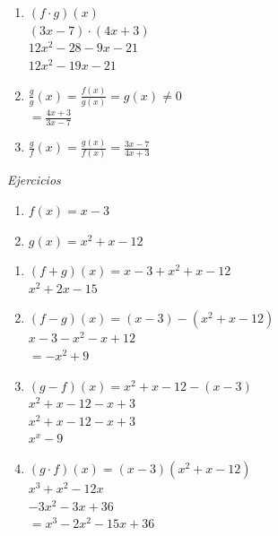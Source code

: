 \documentclass[english,10pt,a4paper]{article}
\begin{document}
{\begin{enumerate}
{	}				
	\item {\center $(f\cdot g)(x)$\\
				$(3x-7)\cdot (4x+3)$\\
				$12x^{2}-28-9x-21$\\
				$12x^{2}-19x-21$\\
	}
	
	
	\item   {\center $\frac{g}{g}(x)=\frac{f(x)}{g(x)}=g(x)\neq 0$\\
		$=\frac{4x+3}{3x-7}$\\
		

	}
	\item {\center $\frac{g}{f}(x)=\frac{g(x)}{f(x)}=\frac{3x-7}{4x+3}$\\
	}

\end{enumerate}
\newpage
{\centering\emph{Ejercicios}\\
}


\begin{enumerate}
	\item {\center $f(x)=x-3$\\
	}
	\item{\center$g(x)=x^{2}+x-12$\\
		
	
	
	
	}
\end{enumerate}


\begin{enumerate}
\item {$(f+g)(x)=x-3+x^{2}+x-12$\\
	$x^{2}+2x-15$\\
	
	
	
	
	}
	\item {$(f-g)(x)=(x-3)-(x^{2}+x-12)$\\
		$x-3-x^{2}-x+12$\\
		$=-x^{2}+9$\\
	}
\item	{$(g-f)(x)=x^{2}+x-12-(x-3)$\\
	$x^{2}+x-12-x+3$\\
	
	$x^2+x-12-x+3$\\
	$x^{x}-9$

}
\item {$(g\cdot f)(x)=(x-3)(x^{2}+x-12)$\\
	$x^{3}+x^{2}-12x$\\
			$-3x^{2}-3x+36$\\
			$=x^{3}-2x^{2}-15x+36$



}
\end{enumerate}}
\end{document}
